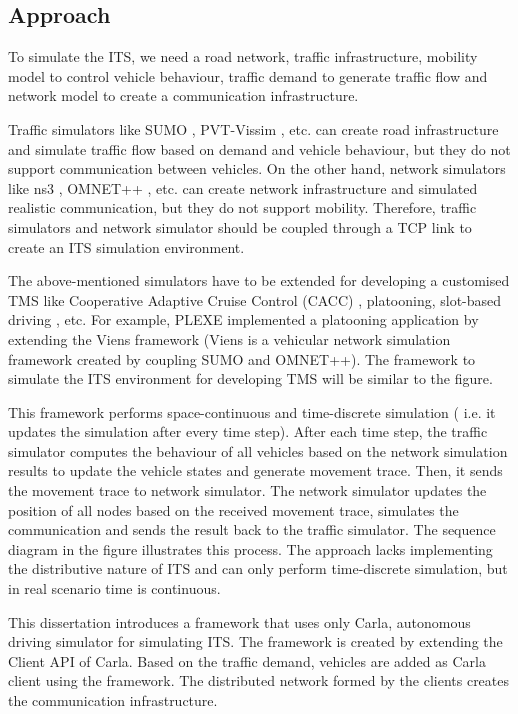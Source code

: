\subsection{Approach}
To simulate the ITS, we need a road network, traffic infrastructure, mobility model to control vehicle behaviour, traffic demand to generate traffic flow and network model to create a communication infrastructure. 

Traffic simulators like SUMO \cite{SUMO2018}, PVT-Vissim \cite{vissim}, etc.  can create road infrastructure and simulate traffic flow based on demand and vehicle behaviour, but they do not support communication between vehicles. On the other hand, network simulators like ns3 \cite{ns3}, OMNET++ \cite{omnet}, etc. can create network infrastructure and simulated realistic communication, but they do not support mobility. Therefore, traffic simulators and network simulator should be coupled through a TCP link to create an ITS simulation environment. 

The above-mentioned simulators have to be extended for developing a customised TMS like Cooperative Adaptive Cruise Control (CACC) \cite{cacc}, platooning, slot-based driving \cite{slot-based}, etc.  For example, PLEXE \cite{plexe} implemented a platooning application by extending the Viens\cite{veins} framework (Viens is a vehicular network simulation framework created by coupling SUMO and OMNET++). The framework to simulate the ITS environment for developing TMS will be similar to the figure. 

This framework performs space-continuous and time-discrete simulation ( i.e. it updates the simulation after every time step). 
After each time step, the traffic simulator computes the behaviour of all vehicles based on the network simulation results to update the vehicle states and generate movement trace. Then, it sends the movement trace to network simulator. The network simulator updates the position of all nodes based on the received movement trace, simulates the communication and sends the result back to the traffic simulator. The sequence diagram in the figure illustrates this process. The approach lacks implementing the distributive nature of ITS and can only perform time-discrete simulation, but in real scenario time is continuous.

This dissertation introduces a framework that uses only Carla, autonomous driving simulator for simulating ITS. The framework is created by extending the Client API of Carla. Based on the traffic demand, vehicles are added as Carla client using the framework. The distributed network formed by the clients creates the communication infrastructure. 

